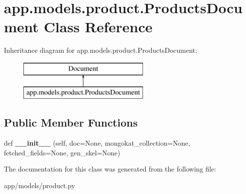 \hypertarget{classapp_1_1models_1_1product_1_1_products_document}{}\section{app.\+models.\+product.\+Products\+Document Class Reference}
\label{classapp_1_1models_1_1product_1_1_products_document}
Inheritance diagram for app.\+models.\+product.\+Products\+Document\+:\begin{figure}[H]
\begin{center}
\leavevmode
\includegraphics[height=2.000000cm]{classapp_1_1models_1_1product_1_1_products_document}
\end{center}
\end{figure}
\subsection*{Public Member Functions}
\begin{DoxyCompactItemize}
\item 
\mbox{\label{classapp_1_1models_1_1product_1_1_products_document_accb9b8892de241c222cb0c611f4b3112}} 
def {\bfseries \+\_\+\+\_\+init\+\_\+\+\_\+} (self, doc=None, mongokat\+\_\+collection=None, fetched\+\_\+fields=None, gen\+\_\+skel=None)
\end{DoxyCompactItemize}


The documentation for this class was generated from the following file\+:\begin{DoxyCompactItemize}
\item 
app/models/product.\+py\end{DoxyCompactItemize}
